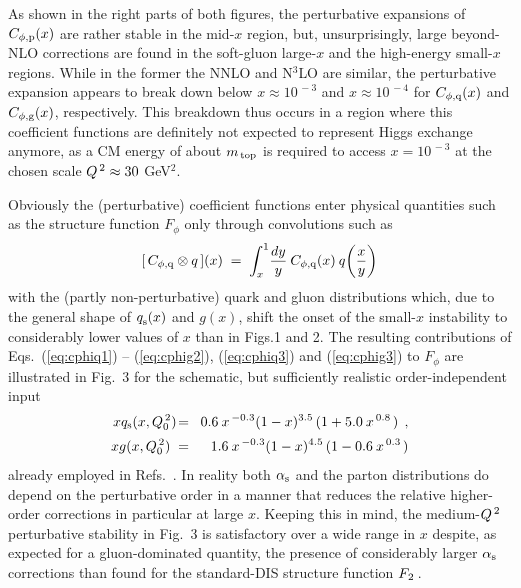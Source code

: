 \documentclass[12pt]{article}
\newcommand{\beq}{\begin{equation}}
\newcommand{\eeq}{\end{equation}}
\newcommand{\bea}{\begin{eqnarray}}
\newcommand{\eea}{\end{eqnarray}}
\newcommand{\nn}{\nonumber}
\newcommand{\as}{\alpha_{\rm s}}
\begin{document}
As shown in the right parts of both figures, the perturbative expansions of
$C_{\rm \phi, p}(x)$ are rather stable in the mid-$x$ region, but,
unsurprisingly, large beyond-NLO corrections are found in the soft-gluon 
large-$x$ and the high-energy small-$x$ regions. While in the former the NNLO 
and N$^3$LO are similar, the perturbative expansion appears to break down below
$x \approx 10^{\,-3}$ and $x \approx 10^{\,-4}$ for $C_{\rm \phi, q}(x)$ and 
$C_{\rm \phi, g}(x)$, respectively. 
This breakdown thus occurs in a region where this coefficient functions are 
definitely not expected to represent Higgs exchange anymore, as a CM energy of 
about $m_{\,\rm top}$ is required to access $x = 10^{\,-3}$ at the chosen scale
${Q^{\, 2}}\approx 30$ GeV$^2$.

Obviously the (perturbative) coefficient functions enter physical quantities 
such as the structure function $F_\phi$ only through convolutions such as
%
\beq
\label{eq:Mconv}
  [\, C_{\rm \phi, q} \otimes q \,](x) \; = \; \int_x^1 \! \frac{dy}{y} 
  \: C_{\rm \phi, q}(x) \: q \!\left( \frac{x}{y} \right)
\eeq
%
with the (partly non-perturbative) quark and gluon distributions which, due
to the general shape of $q_{\rm s}^{}(x)$ and $g(x)$, shift the onset of the 
small-$x$ instability to considerably lower values of $x$ than in Figs.1 and 2.
The resulting contributions of Eqs.~(\ref{eq:cphiq1}) -- (\ref{eq:cphig2}), 
(\ref{eq:cphiq3}) and (\ref{eq:cphig3}) to $F_\phi$ are illustrated in Fig.~3 
for the schematic, but sufficiently realistic order-independent input 
%
\bea
\label{eq:p-sg}
  xq_{\rm s}(x,Q_0^{\,2}) &\! = \! &
  0.6\: x^{\, -0.3} (1-x)^{3.5}\, (1 + 5.0\: x^{\, 0.8\,}) \:\: ,
\nn \\[0.5mm]
  xg (x,Q_0^{\,2})\:\: &\! = \! &
  1.6\: x^{\, -0.3} (1-x)^{4.5}\, (1 - 0.6\: x^{\, 0.3\,})
\eea
%
already employed in Refs.~\cite{MVV4,MVV5,MVV6}. In reality both $\as$ and
the parton distributions do depend on the perturbative order in a manner that
reduces the relative higher-order corrections in particular at large $x$.
Keeping this in mind, the medium-${Q^{\, 2}}$ perturbative stability in Fig.~3 is 
satisfactory over a wide range in $x$ despite, as expected for a 
gluon-dominated quantity, the presence of considerably larger $\as$ corrections
than found for the standard-DIS structure function ${F_{\:\! 2}}\,$.
\end{document}
